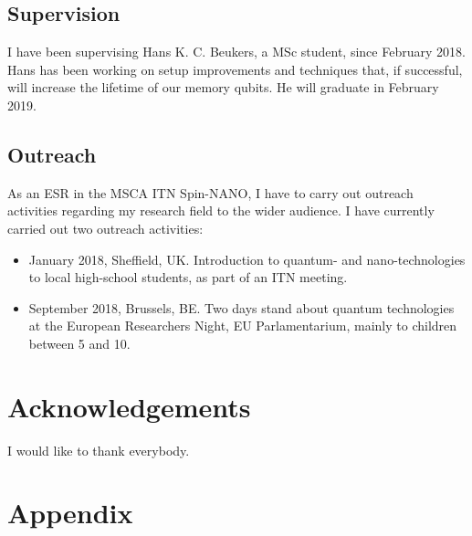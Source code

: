 \documentclass[a4paper]{article}
\begin{document}
\subsection{Supervision}
I have been supervising Hans K. C. Beukers, a MSc student, since February 2018. Hans has been working on setup improvements and techniques that, if successful, will increase the lifetime of our memory qubits. He will graduate in February 2019.

\subsection{Outreach}
As an \ac{ESR} in the \ac{MSCA} \ac{ITN} Spin-NANO, I have to carry out outreach activities regarding my research field to the wider audience. I have currently carried out two outreach activities:
\begin{itemize}
	\item January 2018, Sheffield, UK. Introduction to quantum- and nano-technologies to local high-school students, as part of an \ac{ITN} meeting. 
	\item September 2018, Brussels, BE. Two days stand about quantum technologies at the European Researchers Night, EU Parlamentarium, mainly to children between 5 and 10. 
\end{itemize}

\section*{Acknowledgements}
I would like to thank everybody.

\section*{Appendix}
\renewcommand{\thefigure}{A\arabic{figure}}
\setcounter{figure}{0}
\end{document}
